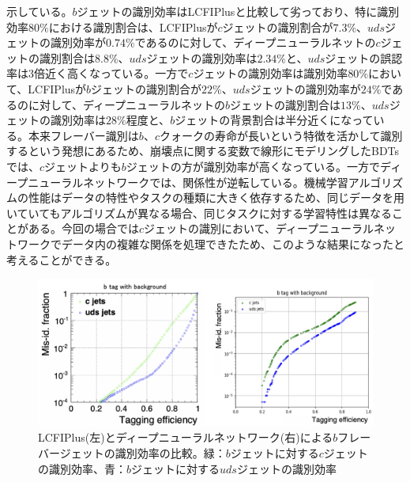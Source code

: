 示している。$b$ジェットの識別効率はLCFIPlusと比較して劣っており、特に識別効率$80\%$における識別割合は、LCFIPlusが$c$ジェットの識別割合が$7.3\%$、$uds$ジェットの識別効率が$0.74\%$であるのに対して、ディープニューラルネットの$c$ジェットの識別割合は$8.8\%$、$uds$ジェットの識別効率は$2.34\%$と、$uds$ジェットの誤認率は3倍近く高くなっている。一方で$c$ジェットの識別効率は識別効率$80\%$において、LCFIPlusが$b$ジェットの識別割合が$22\%$、$uds$ジェットの識別効率が$24\%$であるのに対して、ディープニューラルネットの$b$ジェットの識別割合は$13\%$、$uds$ジェットの識別効率は$28\%程度$と、$b$ジェットの背景割合は半分近くになっている。本来フレーバー識別は$b$、$c$クォークの寿命が長いという特徴を活かして識別するという発想にあるため、崩壊点に関する変数で線形にモデリングしたBDTsでは、$c$ジェットよりも$b$ジェットの方が識別効率が高くなっている。一方でディープニューラルネットワークでは、関係性が逆転している。機械学習アルゴリズムの性能はデータの特性やタスクの種類に大きく依存するため、同じデータを用いていてもアルゴリズムが異なる場合、同じタスクに対する学習特性は異なることがある。今回の場合では$c$ジェットの識別において、ディープニューラルネットワークでデータ内の複雑な関係を処理できたため、このような結果になったと考えることができる。
\begin{figure}[H]
	\begin{center}
 \includegraphics[keepaspectratio, scale=0.3]
 	{Figure/Flavortagging/dnneff_b.png}
 		\caption[LCFIPlusとDNNのb-tagに関する比較]{LCFIPlus(左)とディープニューラルネットワーク(右)による$b$フレーバージェットの識別効率の比較。緑：$b$ジェットに対する$c$ジェットの識別効率、青：$b$ジェットに対する$uds$ジェットの識別効率}
 		\label{dnneff_b}
	\end{center}
\end{figure}

